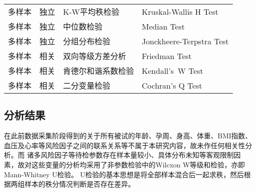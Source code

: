 \begin{center}
\begin{longtable}{m{1.8cm}<{\centering}m{2.5cm}<{\centering}m{5cm}<{\centering}m{6cm}<{\centering}}
         多样本   & 独立    & K-W平均秩检验 & Kruskal-Wallis H Test \\
         多样本   & 独立    & 中位数检验 & Median Test \\
         多样本   & 独立    & 分组分布检验 & Jonckheere-Terpstra Test \\
         多样本   & 相关    & 双向等级方差分析 & Friedman Test \\
         多样本   & 相关    & 肯德尔和谐系数检验 & Kendall's W Test \\
         多样本   & 相关    & 二分变量检验 & Cochran's Q Test \\
    \end{longtable}
\end{center}

\subsection{分析结果}
在此前数据采集阶段得到的关于所有被试的年龄、孕周、身高、体重、BMI指数、血压及心率等风险因子之间的联系关系等不属于本研究内容，故未作任何相关性分析。而
诸多风险因子等待检参数存在样本量较小、具体分布未知等客观限制因素，故对这些变量的分析均采用了非参数检验中的Wilcxon W等级和检验，亦即Mann-Whitney U检验。
U检验的基本思想是将全部样本混合后一起求秩，然后根据两组样本的秩分情况判断是否存在差异。

